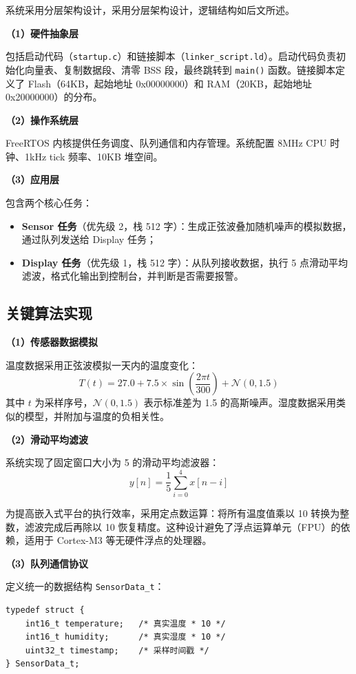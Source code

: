 \documentclass[12pt,a4paper]{ctexart}
\begin{document}
系统采用分层架构设计，采用分层架构设计，逻辑结构如后文所述。

\textbf{（1）硬件抽象层}

包括启动代码（\texttt{startup.c}）和链接脚本（\texttt{linker\_script.ld}）。启动代码负责初始化向量表、复制数据段、清零 BSS 段，最终跳转到 \texttt{main()} 函数。链接脚本定义了 Flash（64KB，起始地址 0x00000000）和 RAM（20KB，起始地址 0x20000000）的分布。

\textbf{（2）操作系统层}

FreeRTOS 内核提供任务调度、队列通信和内存管理。系统配置 8MHz CPU 时钟、1kHz  tick 频率、10KB 堆空间。

\textbf{（3）应用层}

包含两个核心任务：
\begin{itemize}[leftmargin=2em]
    \item \textbf{Sensor 任务}（优先级 2，栈 512 字）：生成正弦波叠加随机噪声的模拟数据，通过队列发送给 Display 任务；
    \item \textbf{Display 任务}（优先级 1，栈 512 字）：从队列接收数据，执行 5 点滑动平均滤波，格式化输出到控制台，并判断是否需要报警。
\end{itemize}

\subsection{关键算法实现}

\textbf{（1）传感器数据模拟}

温度数据采用正弦波模拟一天内的温度变化：
\begin{equation}
    T(t) = 27.0 + 7.5 \times \sin\left(\frac{2\pi t}{300}\right) + \mathcal{N}(0, 1.5)
\end{equation}
其中 $t$ 为采样序号，$\mathcal{N}(0, 1.5)$ 表示标准差为 1.5 的高斯噪声。湿度数据采用类似的模型，并附加与温度的负相关性。

\textbf{（2）滑动平均滤波}

系统实现了固定窗口大小为 5 的滑动平均滤波器：
\begin{equation}
    y[n] = \frac{1}{5}\sum_{i=0}^{4} x[n-i]
\end{equation}

为提高嵌入式平台的执行效率，采用定点数运算：将所有温度值乘以 10 转换为整数，滤波完成后再除以 10 恢复精度。这种设计避免了浮点运算单元（FPU）的依赖，适用于 Cortex-M3 等无硬件浮点的处理器。

\textbf{（3）队列通信协议}

定义统一的数据结构 \texttt{SensorData\_t}：
\begin{lstlisting}[caption={传感器数据结构定义}]
typedef struct {
    int16_t temperature;   /* 真实温度 * 10 */
    int16_t humidity;      /* 真实湿度 * 10 */
    uint32_t timestamp;    /* 采样时间戳 */
} SensorData_t;
\end{lstlisting}
\end{document}
